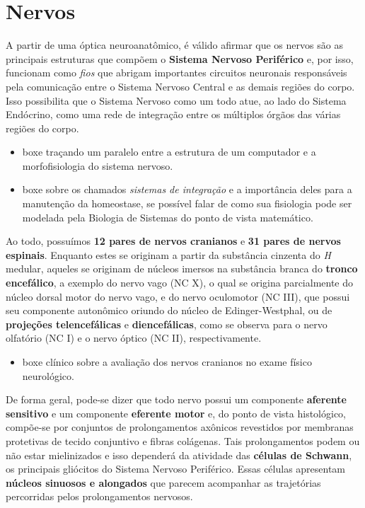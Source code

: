 \documentclass[
]{book}
\providecommand{\tightlist}{%
  \setlength{\itemsep}{0pt}\setlength{\parskip}{0pt}}
\theoremstyle{definition}
\theoremstyle{definition}
\theoremstyle{definition}
\theoremstyle{definition}
\theoremstyle{remark}
\begin{document}
\hypertarget{nervos}{%
\chapter{Nervos}\label{nervos}}

A partir de uma óptica neuroanatômico, é válido afirmar que os nervos são as principais estruturas que compõem o \textbf{Sistema Nervoso Periférico} e, por isso, funcionam como \emph{fios} que abrigam importantes circuitos neuronais responsáveis pela comunicação entre o Sistema Nervoso Central e as demais regiões do corpo. Isso possibilita que o Sistema Nervoso como um todo atue, ao lado do Sistema Endócrino, como uma rede de integração entre os múltiplos órgãos das várias regiões do corpo.

\begin{itemize}
\item
  boxe traçando um paralelo entre a estrutura de um computador e a morfofisiologia do sistema nervoso.
\item
  boxe sobre os chamados \emph{sistemas de integração} e a importância deles para a manutenção da homeostase, se possível falar de como sua fisiologia pode ser modelada pela Biologia de Sistemas do ponto de vista matemático.
\end{itemize}

Ao todo, possuímos \textbf{12 pares de nervos cranianos} e \textbf{31 pares de nervos espinais}. Enquanto estes se originam a partir da substância cinzenta do \emph{H} medular, aqueles se originam de núcleos imersos na substância branca do \textbf{tronco encefálico}, a exemplo do nervo vago (NC X), o qual se origina parcialmente do núcleo dorsal motor do nervo vago, e do nervo oculomotor (NC III), que possui seu componente autonômico oriundo do núcleo de Edinger-Westphal, ou de \textbf{projeções telencefálicas} e \textbf{diencefálicas}, como se observa para o nervo olfatório (NC I) e o nervo óptico (NC II), respectivamente.

\begin{itemize}
\tightlist
\item
  boxe clínico sobre a avaliação dos nervos cranianos no exame físico neurológico.
\end{itemize}

De forma geral, pode-se dizer que todo nervo possui um componente \textbf{aferente sensitivo} e um componente \textbf{eferente motor} e, do ponto de vista histológico, compõe-se por conjuntos de prolongamentos axônicos revestidos por membranas protetivas de tecido conjuntivo e fibras colágenas. Tais prolongamentos podem ou não estar mielinizados e isso dependerá da atividade das \textbf{células de Schwann}, os principais gliócitos do Sistema Nervoso Periférico. Essas células apresentam \textbf{núcleos sinuosos e alongados} que parecem acompanhar as trajetórias percorridas pelos prolongamentos nervosos.
\end{document}
